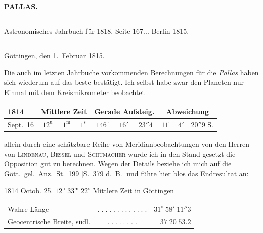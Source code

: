 \clearpage{}\hypertarget{native-388-lower}{}\label{native-388-lower}
\begin{center}\textbf{PALLAS.}\par\vspace{4pt}\hrule\vspace{4pt}\fontsize{10}{12}\selectfont Astronomisches Jahrbuch für 1818. Seite 167\;... Berlin 1815.\par\vspace{4pt}\hrule\vspace{4pt}\end{center}

\begin{flushright}
Göttingen, den 1.\ Februar 1815.
\end{flushright}

\par\indent Die auch im letzten Jahrbuche vorkommenden Berechnungen für die \emph{Pallas} haben sich wiederum auf das beste bestätigt. Ich selbst habe zwar den Planeten nur Einmal mit dem Kreismikrometer beobachtet

\begin{center}
\fontsize{9}{11}\selectfont\setlength{\tabcolsep}{3pt}\renewcommand{\arraystretch}{1.15}\begin{tabular}{l|ccc|ccc|ccc}
1814 & \multicolumn{3}{c|}{Mittlere Zeit} & \multicolumn{3}{c|}{Gerade Aufsteig.} & \multicolumn{3}{c}{Abweichung} \\
\hline
Sept.\ 16 & $12^{\mathrm u}$ & $1^{\mathrm m}$ & $1^{\mathrm s}$ & $146^\circ$ & $16'$ & $23''4$ & $11^\circ$ & $4'$ & $20''9$ S. \\
\end{tabular}
\end{center}

\noindent allein durch eine schätzbare Reihe von Meridianbeobachtungen von den Herren von \textsc{Lindenau}, \textsc{Bessel} und \textsc{Schumacher} wurde ich in den Stand gesetzt die Opposition gut zu berechnen. Wegen der Details beziehe ich mich auf die Gött.\ gel.\ Anz.\ St.\ 199 [S.\ 379 d.\ B.] und führe hier blos das Endresultat an:

\begin{center}1814 Octob. 25. $12^{\mathrm u}\;33^{\mathrm m}\;22^{\mathrm s}$ Mittlere Zeit in Göttingen\end{center}
\begin{center}\fontsize{10}{12}\selectfont\setlength{\tabcolsep}{3pt}\renewcommand{\arraystretch}{1.15}\begin{tabular}{lcr}
Wahre Länge & $.\;.\;.\;.\;.\;.\;.\;.\;.\;.\;.\;.\;.$ & $31^\circ\;58'\;11''3$\\
Geocentrische Breite, südl. & $.\;.\;.\;.\;.\;.\;.\;.$ & $37\;20\;53.2$\\
\end{tabular}\end{center}


